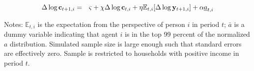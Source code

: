 \begin{table}[t]  
\caption{Micro Consumption Regression on Simulated Data} 
\label{table:CGrowCross} 
\begin{center} 
\begin{eqnarray} 
\CGrowCross    \nonumber %
\end{eqnarray} 
\newsavebox{\crosssecond} 
\usebox{\crosssecond} 
\settowidth{\TableWidth}{\usebox{\crosssecond}} %
\medskip\medskip \parbox{\TableWidth}{\small Notes: $\mathbb{E}_{t,i}$ is the expectation from the perspective of person $i$ in period $t$; $\bar{a}$ is a dummy variable indicating that agent $i$ is in the top 99 percent of the normalized $a$ distribution.  Simulated sample size is large enough such that standard errors are effectively zero.  Sample is restricted to households with positive income in period $t$.}  
\end{center} 
\end{table} 
